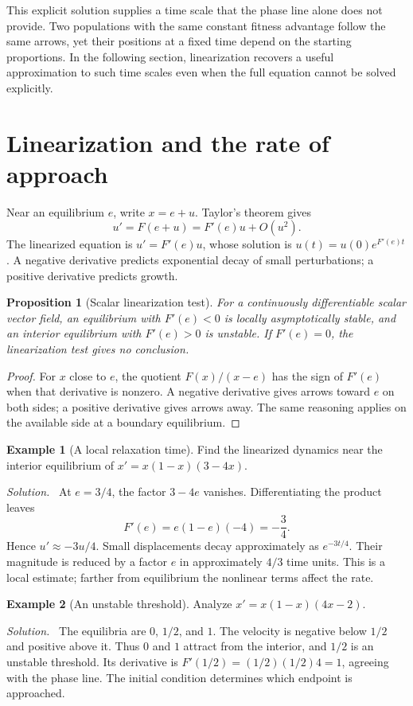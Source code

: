 \documentclass[11pt,oneside,openany]{book}
\newtheorem{proposition}[theorem]{Proposition}
\theoremstyle{definition}
\newtheorem{example}{Example}[chapter]
\theoremstyle{remark}
\newenvironment{solution}{\par\smallskip\noindent\textit{Solution.}\ }{\par\smallskip}
\numberwithin{equation}{chapter}
\begin{document}
This explicit solution supplies a time scale that the phase line alone does not provide. Two populations with the same constant fitness advantage follow the same arrows, yet their positions at a fixed time depend on the starting proportions. In the following section, linearization recovers a useful approximation to such time scales even when the full equation cannot be solved explicitly.

\section{Linearization and the rate of approach}
Near an equilibrium $e$, write $x=e+u$. Taylor's theorem gives
\[
u'=F(e+u)=F'(e)u+O(u^2).
\]
The linearized equation is $u'=F'(e)u$, whose solution is $u(t)=u(0)e^{F'(e)t}$. A negative derivative predicts exponential decay of small perturbations; a positive derivative predicts growth.

\begin{proposition}[Scalar linearization test]
For a continuously differentiable scalar vector field, an equilibrium with $F'(e)<0$ is locally asymptotically stable, and an interior equilibrium with $F'(e)>0$ is unstable. If $F'(e)=0$, the linearization test gives no conclusion.
\end{proposition}
\begin{proof}
For $x$ close to $e$, the quotient $F(x)/(x-e)$ has the sign of $F'(e)$ when that derivative is nonzero. A negative derivative gives arrows toward $e$ on both sides; a positive derivative gives arrows away. The same reasoning applies on the available side at a boundary equilibrium.
\end{proof}

\begin{example}[A local relaxation time]
Find the linearized dynamics near the interior equilibrium of $x'=x(1-x)(3-4x)$.
\begin{solution}
At $e=3/4$, the factor $3-4e$ vanishes. Differentiating the product leaves
\[
F'(e)=e(1-e)(-4)=-\frac34.
\]
Hence $u'\approx-3u/4$. Small displacements decay approximately as $e^{-3t/4}$. Their magnitude is reduced by a factor $e$ in approximately $4/3$ time units. This is a local estimate; farther from equilibrium the nonlinear terms affect the rate.
\end{solution}
\end{example}

\begin{example}[An unstable threshold]
Analyze $x'=x(1-x)(4x-2)$.
\begin{solution}
The equilibria are $0$, $1/2$, and $1$. The velocity is negative below $1/2$ and positive above it. Thus $0$ and $1$ attract from the interior, and $1/2$ is an unstable threshold. Its derivative is $F'(1/2)=(1/2)(1/2)4=1$, agreeing with the phase line. The initial condition determines which endpoint is approached.
\end{solution}
\end{example}
\end{document}
